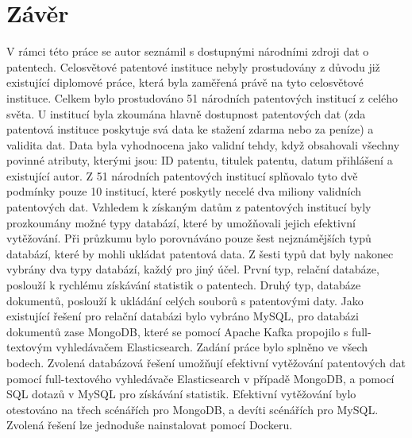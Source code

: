 \chapter{Závěr}
V rámci této práce se autor seznámil s dostupnými národními zdroji dat o patentech. Celosvětové patentové instituce nebyly prostudovány z důvodu již existující diplomové práce, která byla zaměřená právě na tyto celosvětové instituce.
\newline
\indent Celkem bylo prostudováno 51 národních patentových institucí z celého světa. U institucí byla zkoumána hlavně dostupnost patentových dat (zda patentová instituce poskytuje svá data ke stažení zdarma nebo za peníze) a validita dat. Data byla vyhodnocena jako validní tehdy, když obsahovali všechny povinné atributy, kterými jsou: ID patentu, titulek patentu, datum přihlášení a existující autor. Z 51 národních patentových institucí splňovalo tyto dvě podmínky pouze 10 institucí, které poskytly necelé dva miliony validních patentových dat.
\newline
\indent Vzhledem k získaným datům z patentových institucí byly prozkoumány možné typy databází, které by umožňovali jejich efektivní vytěžování. Při průzkumu bylo porovnáváno pouze šest nejznámějších typů databází, které by mohli ukládat patentová data. Z šesti typů dat byly nakonec vybrány dva typy databází, každý pro jiný účel. První typ, relační databáze, poslouží k rychlému získávání statistik o patentech. Druhý typ, databáze dokumentů, poslouží k ukládání celých souborů s patentovými daty. Jako existující řešení pro relační databázi bylo vybráno MySQL, pro databázi dokumentů zase MongoDB, které se pomocí Apache Kafka propojilo s full-textovým vyhledávačem Elasticsearch.
\newline
\indent Zadání práce bylo splněno ve všech bodech. Zvolená databázová řešení umožňují efektivní vytěžování patentových dat pomocí full-textového vyhledávače Elasticsearch v případě MongoDB, a pomocí \gls{SQL} dotazů v MySQL pro získávání statistik. Efektivní vytěžování bylo otestováno na třech scénářích pro MongoDB, a devíti scénářích pro MySQL. Zvolená řešení lze jednoduše nainstalovat pomocí Dockeru.